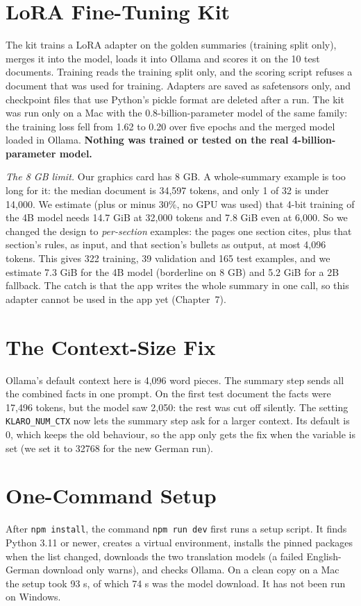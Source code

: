 \documentclass[11pt,a4paper,oneside]{report}
\begin{document}
\section{LoRA Fine-Tuning Kit}
The kit trains a LoRA adapter \cite{hu2022lora} on the golden summaries (training split only), merges it
into the model, loads it into Ollama and scores it on the 10 test documents. Training reads the training split only, and the scoring
script refuses a document that was used for training. Adapters are saved as safetensors only, and checkpoint files that use Python's pickle format are
deleted after a run. The kit was run only on a Mac with the 0.8-billion-parameter model of the same family:
the training loss fell from 1.62 to 0.20 over five epochs and the merged model loaded in Ollama.
\textbf{Nothing was trained or tested on the real 4-billion-parameter model.}

\textit{The 8 GB limit.} Our graphics card has 8 GB. A whole-summary example is too long for it: the
median document is 34,597 tokens, and only 1 of 32 is under 14,000. We estimate (plus or minus 30\%,
no GPU was used) that 4-bit training of the 4B model needs 14.7 GiB at 32,000 tokens and 7.8 GiB even
at 6,000. So we changed the design to \emph{per-section} examples: the pages one section cites, plus
that section's rules, as input, and that section's bullets as output, at most 4,096 tokens. This gives
322 training, 39 validation and 165 test examples, and we estimate 7.3 GiB for the 4B model (borderline
on 8 GB) and 5.2 GiB for a 2B fallback. The catch is that the app writes the whole summary in one call,
so this adapter cannot be used in the app yet (Chapter~7).

\section{The Context-Size Fix}\label{sec:ctxfix}
Ollama's default context here is 4,096 word pieces. The summary step sends all the combined facts in one
prompt. On the first test document the facts were 17,496 tokens, but the model saw 2,050: the rest was
cut off silently. The setting \texttt{KLARO\_NUM\_CTX} now lets the summary step ask for a larger
context. Its default is 0, which keeps the old behaviour, so the app only gets the fix when the
variable is set (we set it to 32768 for the new German run).

\section{One-Command Setup}
After \texttt{npm install}, the command \texttt{npm run dev} first runs a setup script. It finds
Python 3.11 or newer, creates a virtual environment, installs the pinned packages when the list
changed, downloads the two translation models (a failed English-German download only warns), and checks
Ollama. On a clean copy on a Mac the setup took 93 s, of which 74 s was the model download. It has not
been run on Windows.
\end{document}
